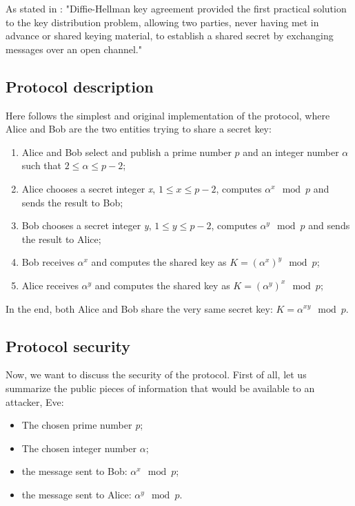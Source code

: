As stated in \cite{hac12}: "Diffie-Hellman key agreement provided the first practical solution to the key distribution problem, allowing two parties, never having met in advance or shared keying material, to establish a shared secret by exchanging messages over an open channel."

\subsection{Protocol description}
Here follows the simplest and original implementation of the protocol, where Alice and Bob are the two entities trying to share a secret key:

\begin{enumerate}
    \item Alice and Bob select and publish a prime number $p$ and an integer number $\alpha$ such that $2 \leq \alpha \leq p-2$;
    \item Alice chooses a secret integer \textit{x}, $1 \leq x \leq p - 2$, computes $\alpha^x\mod{p}$ and sends the result to Bob;
    \item Bob chooses a secret integer \textit{y}, $1 \leq y \leq p - 2$, computes $\alpha^y\mod{p}$ and sends the result to Alice;
    \item Bob receives $\alpha^x$ and computes the shared key as $K = (\alpha^x)^y\mod{p}$;
    \item Alice receives $\alpha^y$ and computes the shared key as $K = (\alpha^y)^x\mod{p}$;
\end{enumerate}

In the end, both Alice and Bob share the very same secret key: $K = \alpha^{xy}\mod{p}$.

\subsection{Protocol security}
Now, we want to discuss the security of the protocol. First of all, let us summarize the public pieces of information that would be available to an attacker, Eve:

\begin{itemize}
    \item The chosen prime number \textit{p};
    \item The chosen integer number $\alpha$;
    \item the message sent to Bob: $\alpha^x\mod{p}$;
    \item the message sent to Alice: $\alpha^y\mod{p}$.
\end{itemize}

